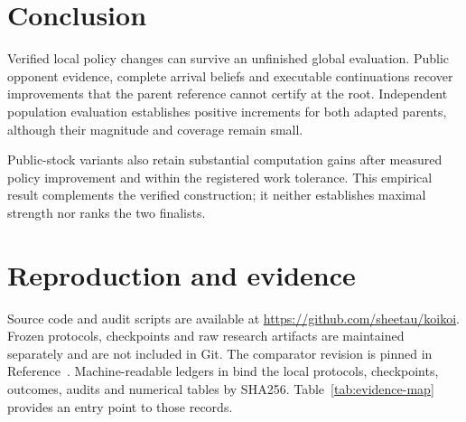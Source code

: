 \documentclass[11pt]{article}
\begin{document}
\section{Conclusion}
Verified local policy changes can survive an unfinished global evaluation.
Public opponent evidence, complete arrival beliefs and executable
continuations recover improvements that the parent reference cannot certify
at the root. Independent population evaluation establishes positive increments
for both adapted parents, although their magnitude and coverage remain small.

Public-stock variants also retain substantial computation gains after measured
policy improvement and within the registered work tolerance. This empirical
result complements the verified construction; it neither establishes maximal
strength nor ranks the two finalists.

\clearpage
\appendix
\section{Reproduction and evidence}
\label{app:reproduction}
Source code and audit scripts are available at
\url{https://github.com/sheetau/koikoi}. Frozen protocols, checkpoints and raw
research artifacts are maintained separately and are not included in Git.
The comparator revision is pinned in Reference~\cite{pinnedkoikoi}.
Machine-readable ledgers in  bind the local
protocols, checkpoints, outcomes, audits and numerical tables by SHA256.
Table~\ref{tab:evidence-map} provides an entry point to those records.
\end{document}
